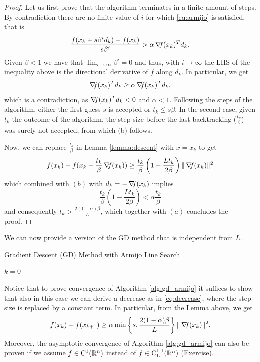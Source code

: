\documentclass[10pt,a4paper]{article}
\begin{document}
\begin{proof}
	Let us first prove that the algorithm terminates in a finite amount of steps. By contradiction there are no finite value of $i$ for which \eqref{eq:armijo} is satisfied, that is 
	\begin{equation*}
		\frac{f(x_k +s \beta^i d_k)- f(x_k)}{s \beta^i} > \alpha \operatorname*{\mathit{\nabla \!f}}(x_k)^Td_k.
	\end{equation*}
Given $\beta<1$ we have that $\lim_{i\to \infty} \beta^i =0$ and thus, with $i\to \infty$ the LHS of the inequality above is the directional derivative of $f$ along $d_k$. In particular, we get
\begin{equation*}
	\operatorname*{\mathit{\nabla \!f}}(x_k)^Td_k \geq \alpha\operatorname*{\mathit{\nabla \!f}}(x_k)^Td_k,
\end{equation*}
which is a contradiction, as $\operatorname*{\mathit{\nabla \!f}}(x_k)^Td_k<0$ and $\alpha <1$.
Following the steps of the algorithm, either the first guess $s$ is accepted or $t_k\leq s\beta$. In the second case, given $t_k$ the outcome of the algorithm, the step size before the last backtracking ($\frac{t_k}{\beta}$) was surely not accepted, from which (b) follows.
\par Now, we can replace $\frac{t_k}{\beta}$ in Lemma \ref{lemma:descent} with $x=x_k$ to get
\begin{equation*}
	f(x_k) - f(x_k -\frac{t_k}{\beta} \operatorname*{\mathit{\nabla \!f}}(x_k)) \geq \frac{t_k}{\beta} \left(1-\frac{L t_k}{2\beta}\right) \| \operatorname*{\mathit{\nabla \!f}}(x_k)\|^2
\end{equation*}
which combined with $(b)$ with $d_k=-\operatorname*{\mathit{\nabla \!f}}(x_k)$ implies
\begin{equation*}
	\frac{t_k}{\beta}\left(1-\frac{L t_k}{2\beta}\right) < \alpha\frac{t_k}{\beta}
\end{equation*}
and consequently $t_k>\frac{2(1-\alpha)\beta}{L}$, which together with $(a)$ concludes the proof.
\end{proof}
\noindent We can now provide a version of the GD method that is independent from $L$.\\
\begin{algorithm}[H]\label{alg:gd_armijo}
	\caption{Gradient Descent (GD) Method with Armijo Line Search}
	
	
	$k = 0$
	
\end{algorithm}
\noindent Notice that to prove convergence of Algorithm \ref{alg:gd_armijo} it suffices to show that also in this case we can derive a decrease as in \eqref{eq:decrease}, where the step size is replaced by a constant term. In particular, from the Lemma above, we get
\begin{equation*}
	f(x_k) - f(x_{k+1}) \geq \alpha  \min \left \{s, \frac{2(1-\alpha)\beta}{L} \right \} \| \operatorname*{\mathit{\nabla \!f}}(x_k)\|^2.
\end{equation*}
\noindent Moreover, the asymptotic convergence of Algorithm \ref{alg:gd_armijo} can also be proven if we assume $f\in \mathord{\mathrm{C^1}}(\mathbb{R}^n)$ instead of $f\in \mathord{\mathrm{C^{1,1}_{L}}}(\mathbb{R}^n)$ (Exercise).
\end{document}
